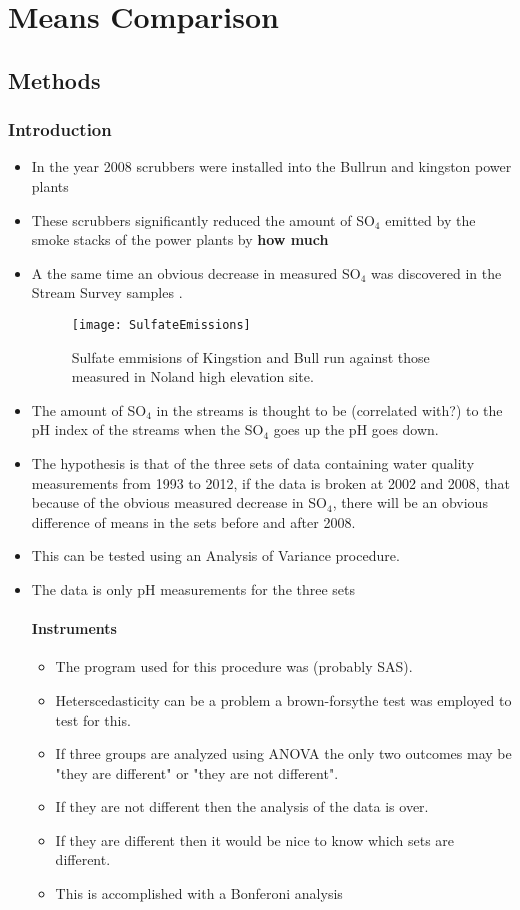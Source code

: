 \chapter{Means Comparison}\label{ch:mc}
\section{Methods}
\subsection{Introduction}
\begin{itemize}
    \item In the year 2008 scrubbers were installed into the Bullrun and kingston power plants
    \item These scrubbers significantly reduced the amount of SO$_4$ emitted by the smoke stacks of the power plants by {\bf how much}
    \item A the same time an obvious decrease in measured SO$_4$ was discovered in the Stream Survey samples \citep{annualreport2012}.
   \begin{figure}[h!]
  \centering
  \texttt{[image: SulfateEmissions]}\\
  \caption{Sulfate emmisions of Kingstion and Bull run against those measured in Noland high elevation site.}\label{fig:sulfateemissions}
\end{figure}
    \item The amount of SO$_4$ in the streams is thought to be (correlated with?) to the pH index of the streams when the SO$_4$ goes up the pH goes down.
    \item The hypothesis is that of the three sets of data containing water quality measurements from 1993 to 2012, if the data is broken at 2002 and 2008, that
    because of the obvious measured decrease in SO$_4$, there will be an obvious difference of means in the sets before and after 2008.
    \item This can be tested using an Analysis of Variance procedure.
    \item The data is only pH measurements for the three sets
    \subsubsection{Instruments}
    \begin{itemize}
        \item The program used for this procedure was (probably SAS).
        \item Heterscedasticity can be a problem a brown-forsythe test was employed to test for this.
        \item If three groups are analyzed using ANOVA the only two outcomes may be "they are different" or "they are not different".
        \item If they are not different then the analysis of the data is over.
        \item If they are different then it would be nice to know which sets are different.
        \item This is accomplished with a Bonferoni analysis
    \end{itemize}
\end{itemize}
